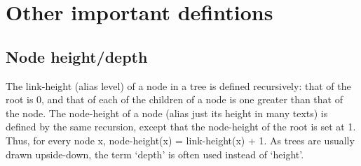 \documentclass[a5paper]{article}
\begin{document}
\section*{Other important defintions}
\subsection*{Node height/depth}
The link-height (alias level) of a node in a tree is defined recursively: that of the root is 0, and that of each of the children of a node is one greater than that of the node.
The node-height of a node (alias just its height in many texts) is defined by the same recursion, except that the node-height of the root is set at 1.
Thus, for every node x, node-height(x) = link-height(x) + 1. As trees are usually drawn upside-down, the term ‘depth’ is often used instead of ‘height’.
\end{document}
